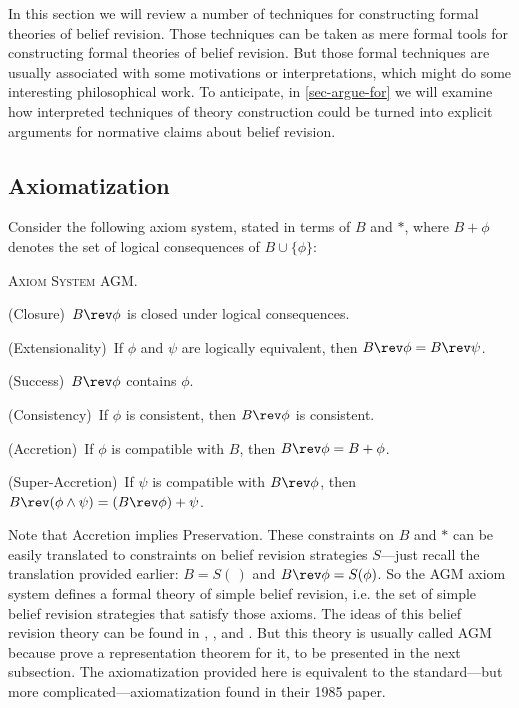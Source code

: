 In this section we will review a number of techniques for constructing formal theories of belief revision. Those techniques can be taken as mere formal tools for constructing formal theories of belief revision. But those formal techniques are usually associated with some motivations or interpretations, which might do some interesting philosophical work. To anticipate, in \autoref{sec-argue-for} we will examine how interpreted techniques of theory construction could be turned into explicit arguments for normative claims about belief revision.


\subsection{Axiomatization}\label{sec-agm}

Consider the following axiom system, stated in terms of $B$ and $*$, where $B + \phi$ denotes the set of logical consequences of $B \cup \{\phi\}$:\op

	\xm \textsc{Axiom System AGM.}

	\xm (Closure)\, $B \rev \phi$ is closed under logical consequences.

	\xm (Extensionality)\, If $\phi$ and $\psi$ are logically equivalent, then $B \rev \phi = B \rev \psi$. 

	\xm (Success)\, $B \rev \phi$ contains $\phi$.

	\xm (Consistency)\, If $\phi$ is consistent, then $B \rev \phi$ is consistent.

	\xm (Accretion)\, If $\phi$ is compatible with $B$, then $B \rev \phi = B + \phi$.

	\xm (Super-Accretion)\, If $\psi$ is compatible with $B \rev \phi$, then $B \rev (\phi \wedge \psi) = (B \rev \phi) + \psi$.

\ed Note that Accretion implies Preservation. These constraints on $B$ and $*$ can be easily translated to constraints on belief revision strategies $S$---just recall the translation provided earlier: $B = S(\,)$ and $B \rev \phi = S(\phi)$. So the AGM axiom system defines a formal theory of simple belief revision, i.e. the set of simple belief revision strategies that satisfy those axioms. The ideas of this belief revision theory can be found in \citet{harper1975rational}, \citet{harper1976rational}, and \citet{levi1978subjunctives}. But this theory is usually called AGM because \citet*{alchourron1985logic} prove a representation theorem for it, to be presented in the next subsection. The axiomatization provided here is equivalent to the standard---but more complicated---axiomatization found in their 1985 paper.

